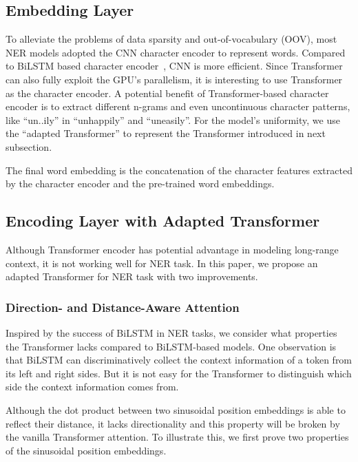 \documentclass[11pt,a4paper]{article}
\begin{document}
\subsection{Embedding Layer}



To alleviate the problems of data sparsity and out-of-vocabulary (OOV), most NER models adopted the CNN character encoder \cite{ma2016end,ye2018hybrid,chen2019grn} to represent words.
Compared to BiLSTM based character encoder~\citep{lample2016neural,ghaddar2018robust}, CNN is more efficient. Since Transformer can also fully exploit the GPU's parallelism, it is interesting to use Transformer as the character encoder. A potential benefit of Transformer-based character encoder is to extract different n-grams and even uncontinuous character patterns, like ``un..ily'' in ``unhappily'' and ``uneasily''. For the model's uniformity, we use the ``adapted Transformer'' to represent the Transformer introduced in next subsection.

The final word embedding is the concatenation of the character features extracted by the character encoder and the pre-trained word embeddings.

\subsection{Encoding Layer with Adapted Transformer}



Although Transformer encoder has potential advantage in modeling long-range context, it is not working well for NER task. In this paper, we propose an adapted Transformer for NER task with two improvements.

\subsubsection{Direction- and Distance-Aware Attention}

Inspired by the success of BiLSTM in NER tasks, we consider what properties the Transformer lacks compared to BiLSTM-based models. One observation is that BiLSTM can discriminatively collect the context information of a token from its left and right sides. But it is not easy for the Transformer to distinguish which side the context information comes from.

Although the dot product between two sinusoidal position embeddings is able to reflect their distance, it lacks directionality and this property will be broken by the vanilla Transformer attention. To illustrate this, we first prove two properties of the sinusoidal position embeddings.
\end{document}
